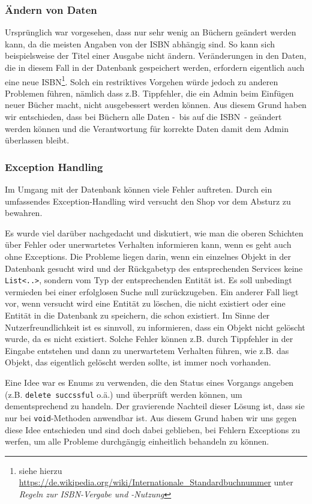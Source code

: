 		\subsubsection{Ändern von Daten}\label{umsetzung:DB:Aendern}
		Ursprünglich war vorgesehen, dass nur sehr wenig an Büchern geändert werden kann, da die meisten Angaben von der ISBN abhängig sind. So kann sich beispielsweise der Titel einer Ausgabe nicht ändern. Veränderungen in den Daten, die in diesem Fall in der Datenbank gespeichert werden, erfordern eigentlich auch eine neue ISBN\footnote{siehe hierzu \url{https://de.wikipedia.org/wiki/Internationale\_Standardbuchnummer} unter \textit{Regeln zur ISBN-Vergabe und -Nutzung}}. Solch ein restriktives Vorgehen würde jedoch zu anderen Problemen führen, nämlich dass z.B. Tippfehler, die ein Admin beim Einfügen neuer Bücher macht, nicht ausgebessert werden können. Aus diesem Grund haben wir entschieden, dass bei Büchern alle Daten -~bis auf die ISBN~- geändert werden können und die Verantwortung für korrekte Daten damit dem Admin überlassen bleibt.
	
		\subsubsection{Exception Handling}\label{umsetzung:DB:Exception}
		Im Umgang mit der Datenbank können viele Fehler auftreten. Durch ein umfassendes Exception-Handling wird versucht den Shop vor dem Absturz zu bewahren.
			
		Es wurde viel darüber nachgedacht und diskutiert, wie man die oberen Schichten über Fehler oder unerwartetes Verhalten informieren kann, wenn es geht auch ohne Exceptions. Die Probleme liegen darin, wenn ein einzelnes Objekt in der Datenbank gesucht wird und der Rückgabetyp des entsprechenden Services keine \texttt{List\textless..\textgreater}, sondern vom Typ der entsprechenden Entität ist. Es soll unbedingt vermieden bei einer erfolglosen Suche null zurückzugeben. Ein anderer Fall liegt vor, wenn versucht wird eine Entität zu löschen, die nicht existiert oder eine Entität in die Datenbank zu speichern, die schon existiert. Im Sinne der Nutzerfreundlichkeit ist es sinnvoll, zu informieren, dass ein Objekt nicht gelöscht wurde, da es nicht existiert. Solche Fehler können z.B. durch Tippfehler in der Eingabe entstehen und dann zu unerwartetem Verhalten führen, wie z.B. das Objekt, das eigentlich gelöscht werden sollte, ist immer noch vorhanden.
		
		Eine Idee war es Enums zu verwenden, die den Status eines Vorgangs angeben (z.B. \texttt{delete succssful} o.ä.) und überprüft werden können, um dementsprechend zu handeln. Der gravierende Nachteil dieser Lösung ist, dass sie nur bei \texttt{void}-Methoden anwendbar ist. Aus diesem Grund haben wir uns gegen diese Idee entschieden und sind doch dabei geblieben, bei Fehlern Exceptions zu werfen, um alle Probleme durchgängig einheitlich behandeln zu können.
			
